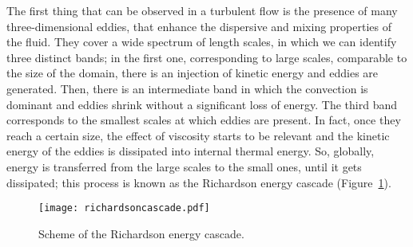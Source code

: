 The first thing that can be observed in a turbulent flow is the presence of 
many three-dimensional eddies, that enhance the dispersive and mixing 
properties 
of the fluid. 
They cover a wide spectrum of length scales, in which we can identify 
three distinct bands; in the first one, corresponding to large scales, 
comparable to the size of the domain, there is an injection of kinetic energy 
and eddies are generated. Then, there is an intermediate band in which the 
convection is dominant and eddies shrink without a significant loss of energy. 
The third band corresponds to the smallest scales at which eddies are present. 
In fact, once they reach a certain size, the effect of viscosity starts to 
be relevant and the kinetic energy of the eddies is dissipated
into internal thermal energy. So, globally, energy is transferred from the 
large 
scales to the small ones, until it gets dissipated; this process is known as 
the Richardson energy cascade (Figure~\ref{fig:cascade}).
\begin{figure}%
	\centering
	\texttt{[image: richardsoncascade.pdf]}
	\caption[Richardson energy cascade]{Scheme of the Richardson energy 
	cascade.}
	\label{fig:cascade}
\end{figure}
%

